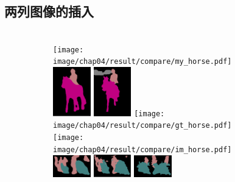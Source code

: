\subsection{两列图像的插入}

\begin{figure}[h!] %
	\begin{subfigure}{0.55\textwidth}
		 \\
		\texttt{[image: image/chap04/result/compare/my\_horse.pdf]}
		\includegraphics[width=0.18\textwidth]{image/chap04/result/compare/fcn_horse.png}
		\includegraphics[width=0.18\textwidth]{image/chap04/result/compare/sds_horse.png}
		\texttt{[image: image/chap04/result/compare/gt\_horse.pdf]}
		\texttt{[image: image/chap04/result/compare/im\_horse.pdf]}
		\\
		\includegraphics[width=0.18\textwidth]{image/chap04/result/compare/my_motor.png}
		\includegraphics[width=0.18\textwidth]{image/chap04/result/compare/fcn_motor.png}
		\includegraphics[width=0.18\textwidth]{image/chap04/result/compare/sds_motor.png}

\end{subfigure}
\end{figure}

